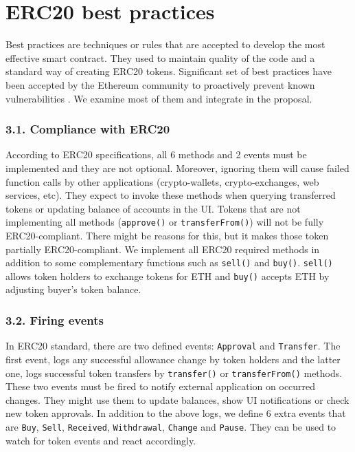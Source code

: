 
\section{ERC20 best practices}\label{section:bp}
Best practices are techniques or rules that are accepted to develop the most effective smart contract. They used to maintain quality of the code and a standard way of creating ERC20 tokens. Significant set of best practices have been accepted by the Ethereum community to proactively prevent known vulnerabilities \cite{TokenBP}. We examine most of them and integrate in the proposal.

\subsubsection*{3.1. Compliance with ERC20}
According to ERC20 specifications, all 6 methods and 2 events must be implemented and they are not optional. Moreover, ignoring them will cause failed function calls by other applications (\ie crypto-wallets, crypto-exchanges, web services, etc). They expect to invoke these methods when querying transferred tokens or updating balance of accounts in the UI. Tokens that are not implementing all methods (\eg \texttt{approve()} or \texttt{transferFrom()}) will not be fully ERC20-compliant. There might be reasons for this, but it makes those token partially ERC20-compliant. We implement all ERC20 required methods in addition to some complementary functions such as \texttt{sell()} and \texttt{buy()}. \texttt{sell()} allows token holders to exchange tokens for ETH and \texttt{buy()} accepts ETH by adjusting buyer's token balance.

\subsubsection*{3.2. Firing events}
In ERC20 standard, there are two defined events: \texttt{Approval} and \texttt{Transfer}. The first event, logs any successful allowance change by token holders and the latter one, logs successful token transfers by \texttt{transfer()} or \texttt{transferFrom()} methods. These two events must be fired to notify external application on occurred changes. They might use them to update balances, show UI notifications or check new token approvals. In addition to the above logs, we define 6 extra events that are \texttt{Buy}, \texttt{Sell}, \texttt{Received}, \texttt{Withdrawal}, \texttt{Change} and \texttt{Pause}. They can be used to watch for token events and react accordingly.

